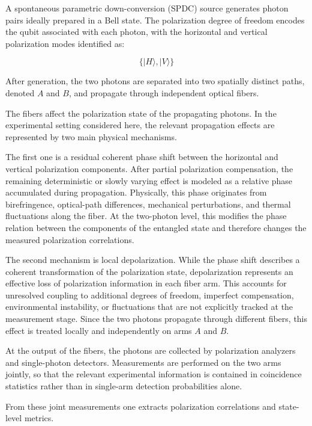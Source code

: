 A spontaneous parametric down-conversion (SPDC) source generates photon pairs ideally prepared in a Bell state. The polarization degree of freedom encodes the qubit associated with each photon, with the horizontal and vertical polarization modes identified as:

\[
\{|H\rangle, |V\rangle\}
\]

After generation, the two photons are separated into two spatially distinct paths, denoted \(A\) and \(B\), and propagate through independent optical fibers.

\medskip

The fibers affect the polarization state of the propagating photons. In the experimental setting considered here, the relevant propagation effects are represented by two main physical mechanisms.

The first one is a residual coherent phase shift between the horizontal and vertical polarization components. After partial polarization compensation, the remaining deterministic or slowly varying effect is modeled as a relative phase accumulated during propagation. Physically, this phase originates from birefringence, optical-path differences, mechanical perturbations, and thermal fluctuations along the fiber. At the two-photon level, this modifies the phase relation between the components of the entangled state and therefore changes the measured polarization correlations.

\medskip

The second mechanism is local depolarization. While the phase shift describes a coherent transformation of the polarization state, depolarization represents an effective loss of polarization information in each fiber arm. This accounts for unresolved coupling to additional degrees of freedom, imperfect compensation, environmental instability, or fluctuations that are not explicitly tracked at the measurement stage. Since the two photons propagate through different fibers, this effect is treated locally and independently on arms \(A\) and \(B\).

\medskip

At the output of the fibers, the photons are collected by polarization analyzers and single-photon detectors. Measurements are performed on the two arms jointly, so that the relevant experimental information is contained in coincidence statistics rather than in single-arm detection probabilities alone.

From these joint measurements one extracts polarization correlations and state-level metrics.

